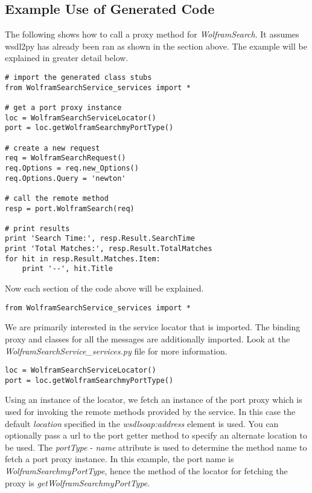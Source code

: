 \subsection{Example Use of Generated Code}

The following shows how to call a proxy method for {\it WolframSearch}.  It
assumes wsdl2py has already been ran as shown in the section above.  The example
will be explained in greater detail below.

\begin{verbatim}
# import the generated class stubs
from WolframSearchService_services import *

# get a port proxy instance
loc = WolframSearchServiceLocator()
port = loc.getWolframSearchmyPortType()

# create a new request
req = WolframSearchRequest()
req.Options = req.new_Options()
req.Options.Query = 'newton'

# call the remote method
resp = port.WolframSearch(req)

# print results
print 'Search Time:', resp.Result.SearchTime
print 'Total Matches:', resp.Result.TotalMatches
for hit in resp.Result.Matches.Item:
    print '--', hit.Title
\end{verbatim}

Now each section of the code above will be explained.

\begin{verbatim}
from WolframSearchService_services import *
\end{verbatim}

We are primarily interested in the service locator that is imported.  The 
binding proxy and classes for all the messages are additionally imported.
Look at the {\it WolframSearchService_services.py} file for more information.

\begin{verbatim}
loc = WolframSearchServiceLocator()
port = loc.getWolframSearchmyPortType()
\end{verbatim}

Using an instance of the locator, we fetch an instance of the port proxy
which is used for invoking the remote methods provided by the service.  In
this case the default {\it location} specified in the {\it wsdlsoap:address}
element is used.  You can optionally pass a url to the port getter method to
specify an alternate location to be used.  The {\it portType} - {\it name} 
attribute is used to determine the method name to fetch a port proxy instance.
In this example, the port name is {\it WolframSearchmyPortType}, hence the 
method of the locator for fetching the proxy is {\it getWolframSearchmyPortType}.

